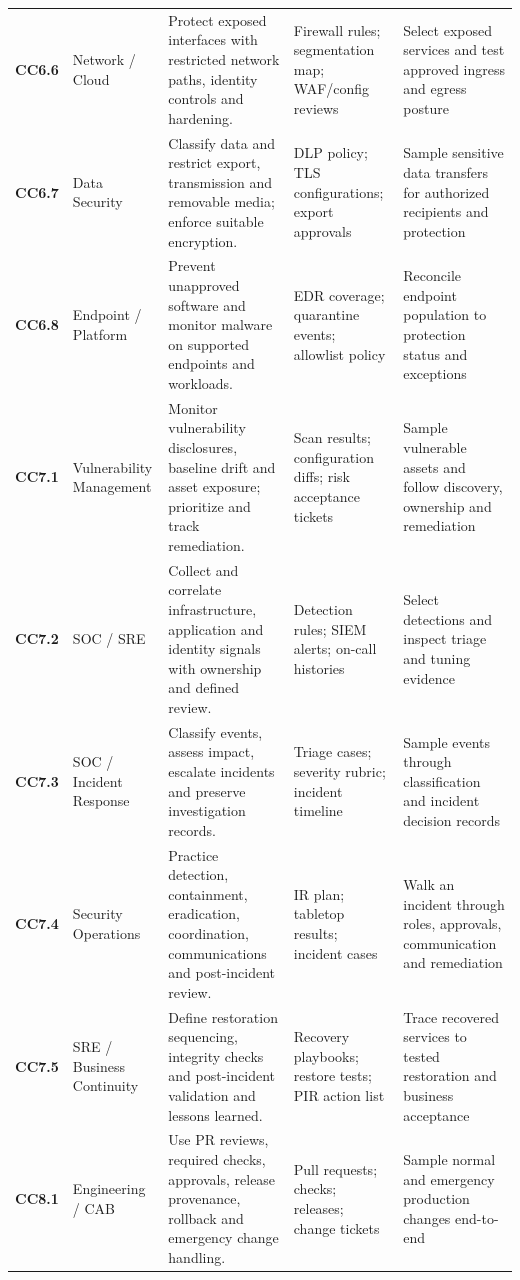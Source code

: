 \documentclass[10pt,oneside]{report}
\begin{document}
\begin{landscape}
\begin{longtable}{@{}>{\raggedright\arraybackslash}p{0.6in}>{\raggedright\arraybackslash}p{1.0in}>{\raggedright\arraybackslash}p{2.5in}>{\raggedright\arraybackslash}p{2.35in}>{\raggedright\arraybackslash}p{2.20in}@{}}
\textbf{CC6.6} & Network / Cloud & Protect exposed interfaces with restricted network paths, identity controls and hardening. & Firewall rules; segmentation map; WAF/config reviews & Select exposed services and test approved ingress and egress posture \\
\addlinespace[5pt]
\textbf{CC6.7} & Data Security & Classify data and restrict export, transmission and removable media; enforce suitable encryption. & DLP policy; TLS configurations; export approvals & Sample sensitive data transfers for authorized recipients and protection \\
\addlinespace[5pt]
\textbf{CC6.8} & Endpoint / Platform & Prevent unapproved software and monitor malware on supported endpoints and workloads. & EDR coverage; quarantine events; allowlist policy & Reconcile endpoint population to protection status and exceptions \\
\addlinespace[5pt]
\textbf{CC7.1} & Vulnerability Management & Monitor vulnerability disclosures, baseline drift and asset exposure; prioritize and track remediation. & Scan results; configuration diffs; risk acceptance tickets & Sample vulnerable assets and follow discovery, ownership and remediation \\
\addlinespace[5pt]
\textbf{CC7.2} & SOC / SRE & Collect and correlate infrastructure, application and identity signals with ownership and defined review. & Detection rules; SIEM alerts; on-call histories & Select detections and inspect triage and tuning evidence \\
\addlinespace[5pt]
\textbf{CC7.3} & SOC / Incident Response & Classify events, assess impact, escalate incidents and preserve investigation records. & Triage cases; severity rubric; incident timeline & Sample events through classification and incident decision records \\
\addlinespace[5pt]
\textbf{CC7.4} & Security Operations & Practice detection, containment, eradication, coordination, communications and post-incident review. & IR plan; tabletop results; incident cases & Walk an incident through roles, approvals, communication and remediation \\
\addlinespace[5pt]
\textbf{CC7.5} & SRE / Business Continuity & Define restoration sequencing, integrity checks and post-incident validation and lessons learned. & Recovery playbooks; restore tests; PIR action list & Trace recovered services to tested restoration and business acceptance \\
\addlinespace[5pt]
\textbf{CC8.1} & Engineering / CAB & Use PR reviews, required checks, approvals, release provenance, rollback and emergency change handling. & Pull requests; checks; releases; change tickets & Sample normal and emergency production changes end-to-end \\

\end{longtable}
\end{landscape}
\end{document}
